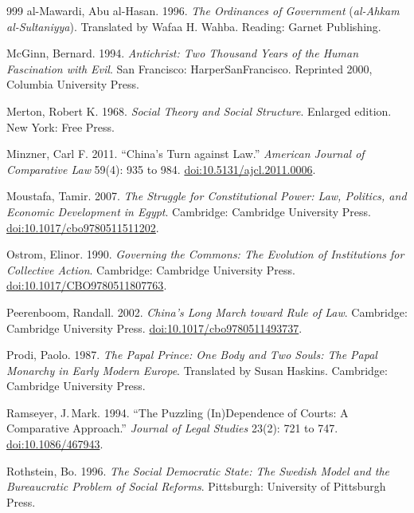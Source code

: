 \documentclass[11pt,letterpaper]{article}
\theoremstyle{definition}
\theoremstyle{remark}
\begin{document}
\begin{thebibliography}{999}
al-Mawardi, Abu al-Hasan. 1996. \emph{The Ordinances of Government} (\emph{al-Ahkam al-Sultaniyya}). Translated by Wafaa H. Wahba. Reading: Garnet Publishing.

McGinn, Bernard. 1994. \emph{Antichrist: Two Thousand Years of the Human Fascination with Evil}. San Francisco: HarperSanFrancisco. Reprinted 2000, Columbia University Press.

Merton, Robert K. 1968. \emph{Social Theory and Social Structure}. Enlarged edition. New York: Free Press.

Minzner, Carl F. 2011. ``China's Turn against Law.'' \emph{American Journal of Comparative Law} 59(4): 935 to 984. \href{https://doi.org/10.5131/ajcl.2011.0006}{doi:10.5131/ajcl.2011.0006}.

Moustafa, Tamir. 2007. \emph{The Struggle for Constitutional Power: Law, Politics, and Economic Development in Egypt}. Cambridge: Cambridge University Press. \href{https://doi.org/10.1017/cbo9780511511202}{doi:10.1017/cbo9780511511202}.

Ostrom, Elinor. 1990. \emph{Governing the Commons: The Evolution of Institutions for Collective Action}. Cambridge: Cambridge University Press. \href{https://doi.org/10.1017/CBO9780511807763}{doi:10.1017/CBO9780511807763}.

Peerenboom, Randall. 2002. \emph{China's Long March toward Rule of Law}. Cambridge: Cambridge University Press. \href{https://doi.org/10.1017/cbo9780511493737}{doi:10.1017/cbo9780511493737}.

Prodi, Paolo. 1987. \emph{The Papal Prince: One Body and Two Souls: The Papal Monarchy in Early Modern Europe}. Translated by Susan Haskins. Cambridge: Cambridge University Press.

Ramseyer, J.\,Mark. 1994. ``The Puzzling (In)Dependence of Courts: A Comparative Approach.'' \emph{Journal of Legal Studies} 23(2): 721 to 747. \href{https://doi.org/10.1086/467943}{doi:10.1086/467943}.

Rothstein, Bo. 1996. \emph{The Social Democratic State: The Swedish Model and the Bureaucratic Problem of Social Reforms}. Pittsburgh: University of Pittsburgh Press.


\end{thebibliography}
\end{document}
